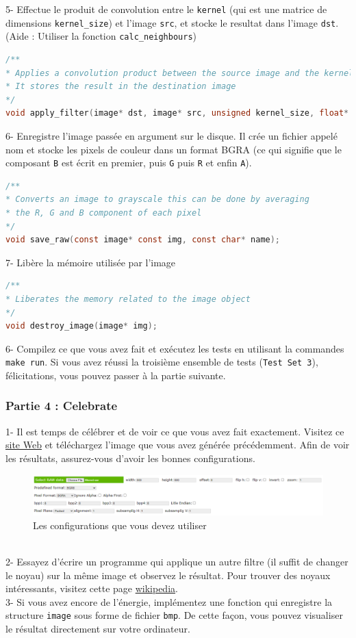 \documentclass[a4paper]{article}
\begin{document}
	5- Effectue le produit de convolution entre le \texttt{kernel} (qui est une matrice de dimensions \texttt{kernel\_size}) et l'image \texttt{src}, et stocke le resultat dans l'image \texttt{dst}. (Aide : Utiliser la fonction \texttt{calc\_neighbours})
	\begin{lstlisting}[language=C]
/**
* Applies a convolution product between the source image and the kernel
* It stores the result in the destination image 
*/
void apply_filter(image* dst, image* src, unsigned kernel_size, float* kernel);
	\end{lstlisting}

	6- Enregistre l'image passée en argument sur le disque. Il crée un fichier appelé nom et stocke les pixels de couleur dans un format BGRA (ce qui signifie que le composant \texttt{B} est écrit en premier, puis \texttt{G} puis \texttt{R} et enfin \texttt{A}).
	\begin{lstlisting}[language=C]
/**
* Converts an image to grayscale this can be done by averaging
* the R, G and B component of each pixel
*/
void save_raw(const image* const img, const char* name);
	\end{lstlisting}
	
	7- Libère la mémoire utilisée par l'image
	\begin{lstlisting}[language=C]
/**
* Liberates the memory related to the image object
*/ 
void destroy_image(image* img);
	\end{lstlisting}
	6- Compilez ce que vous avez fait et exécutez les tests en utilisant la commandes \texttt{make run}. Si vous avez réussi la troisième ensemble de tests (\texttt{Test Set 3}), félicitations, vous pouvez passer à la partie suivante.
	
	\subsubsection*{Partie 4 : Celebrate}
	1- Il est temps de célébrer et de voir ce que vous avez fait exactement. Visitez ce \href{https://rawpixels.net/}{site Web} et téléchargez l'image que vous avez générée précédemment. Afin de voir les résultats, assurez-vous d'avoir les bonnes configurations.
	\begin{figure}[!h]
		\centering
		\includegraphics[width=170mm]{resources/raw_pixel_config}
		\caption{Les configurations que vous devez utiliser}
	\end{figure}\\
	2- Essayez d'écrire un programme qui applique un autre filtre (il suffit de changer le noyau) sur la même image et observez le résultat. 
	Pour trouver des noyaux intéressants, visitez cette page \href{https://en.wikipedia.org/wiki/Kernel_(image_processing)}{wikipedia}.\\
	3- Si vous avez encore de l'énergie, implémentez une fonction qui enregistre la structure \texttt{image} sous forme de fichier \texttt{bmp}. De cette façon, vous pouvez visualiser le résultat directement sur votre ordinateur.
	
\end{document}
